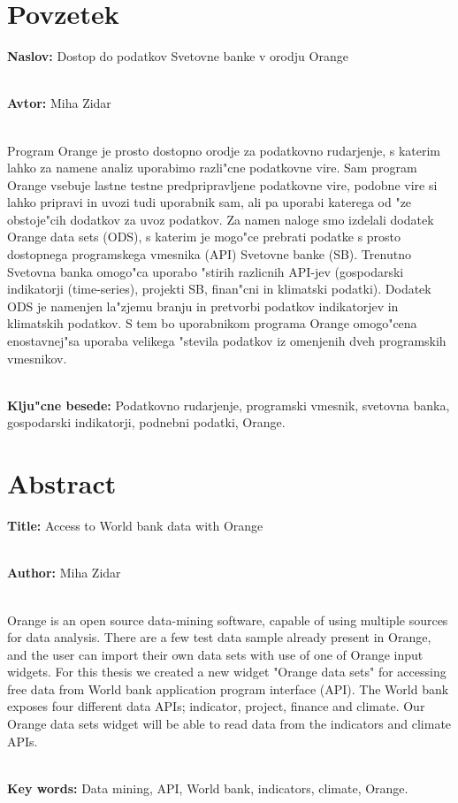 \chapter*{Povzetek}


\textbf{Naslov:} Dostop do podatkov Svetovne banke v orodju Orange

\ \\
\textbf{Avtor:} Miha Zidar

\ \\
Program Orange je prosto dostopno orodje za podatkovno rudarjenje, s katerim
lahko za namene analiz uporabimo razli"cne podatkovne vire. Sam program Orange
vsebuje lastne testne predpripravljene podatkovne vire, podobne vire si lahko 
pripravi in uvozi tudi uporabnik sam, ali pa uporabi katerega od "ze obstoje"cih
dodatkov za uvoz podatkov. Za namen naloge smo izdelali dodatek Orange data sets (ODS),
s katerim je mogo"ce prebrati podatke s prosto dostopnega programskega vmesnika 
(API) Svetovne banke (SB). Trenutno Svetovna banka omogo"ca uporabo "stirih razlicnih API-jev
(gospodarski indikatorji (time-series), projekti SB, finan"cni in klimatski podatki). Dodatek ODS
je namenjen la"zjemu branju in pretvorbi podatkov indikatorjev in klimatskih podatkov.
S tem bo uporabnikom programa Orange omogo"cena enostavnej"sa uporaba velikega "stevila
podatkov iz omenjenih dveh programskih vmesnikov.

\ \\
\textbf{Klju"cne besede:} Podatkovno rudarjenje, programski vmesnik, 
svetovna banka, gospodarski indikatorji, podnebni podatki, Orange. 




\clearemptydoublepage

\chapter*{Abstract}


\textbf{Title:} Access to World bank data with Orange

\ \\
\textbf{Author:} Miha Zidar

\ \\
Orange is an open source data-mining software, capable of using multiple
sources for data analysis. There are a few test data sample already present
in Orange, and the user can import their own data sets with use of one of
Orange input widgets. For this thesis we created a new widget "Orange data sets"
for accessing free data from World bank application program interface (API).
The World bank exposes four different data APIs; indicator, project, finance
and climate. Our Orange data sets widget will be able to read data from the
indicators and climate APIs.


\ \\
\textbf{Key words:} Data mining, API, World bank, indicators, climate, Orange.

